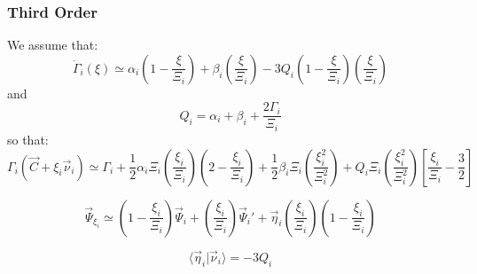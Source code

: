 \documentclass[aps,12pt]{revtex4}
\begin{document}
\subsubsection{Third Order}
We assume that:
\begin{equation}
	\dot\Gamma_i(\xi) \simeq \alpha_i \left(1-\dfrac{\xi}{\Xi_i}\right) + \beta_i \left(\dfrac{\xi}{\Xi_i}\right) - 3 Q_i \left(1-\dfrac{\xi}{\Xi_i}\right) \left(\dfrac{\xi}{\Xi_i}\right) 
\end{equation}
and
\begin{equation}
	Q_i = \alpha_i + \beta_i + \dfrac{2\Gamma_i}{\Xi_i}
\end{equation}
so that:
\begin{equation}
	\Gamma_i(\vec{C}+\xi_i \vec{\nu}_i) \simeq \Gamma_i 
	 + \dfrac{1}{2}\alpha_i \Xi_i 
	 \left(\dfrac{\xi_i}{\Xi_i}\right) 
	 \left( 2 -  \dfrac{\xi_i}{\Xi_i}\right) 
	 + \dfrac{1}{2} \beta_i \Xi_i \left(\dfrac{\xi_i^2}{\Xi_i^2}\right)
	 + Q_i \Xi_i\left(\dfrac{\xi_i^2}{\Xi_i^2}\right) \left[\dfrac{\xi_i}{\Xi_i}-\dfrac{3}{2}\right]
\end{equation}


\begin{equation}
	\vec{\Psi}_{\xi_i} \simeq 
	\left(1-\dfrac{\xi_i}{\Xi_i}\right) \vec{\Psi}_i + \left(\dfrac{\xi_i}{\Xi_i}\right) \vec{\Psi}_i' 
	+ \vec{\eta}_i \left(\dfrac{\xi_i}{\Xi_i}\right) \left(1-\dfrac{\xi_i}{\Xi_i}\right)
\end{equation}

\begin{equation}
	\langle \vec{\eta}_i \vert \vec{\nu}_i \rangle = -3 Q_i 
\end{equation}
\end{document}
